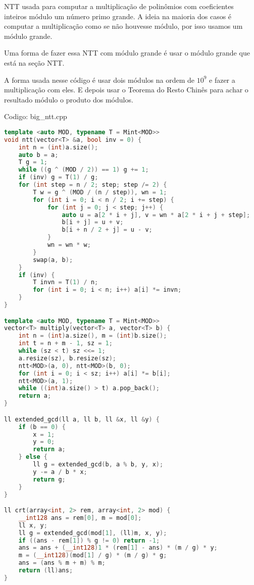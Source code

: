 \documentclass[10pt, a4paper, oneside]{book}
\begin{document}
NTT usada para computar a multiplicação de polinômios com coeficientes inteiros módulo um número primo grande. A ideia na maioria dos casos é computar a multiplicação como se não houvesse módulo, por isso usamos um módulo grande.



Uma forma de fazer essa NTT com módulo grande é usar o módulo grande que está na seção NTT.



A forma usada nesse código é usar dois módulos na ordem de $10^9$ e fazer a multiplicação com eles. E depois usar o Teorema do Resto Chinês para achar o resultado módulo o produto dos módulos.
\hfill

Codigo: big\_ntt.cpp

\begin{lstlisting}[language=C++]
template <auto MOD, typename T = Mint<MOD>>
void ntt(vector<T> &a, bool inv = 0) {
    int n = (int)a.size();
    auto b = a;
    T g = 1;
    while ((g ^ (MOD / 2)) == 1) g += 1;
    if (inv) g = T(1) / g;
    for (int step = n / 2; step; step /= 2) {
        T w = g ^ (MOD / (n / step)), wn = 1;
        for (int i = 0; i < n / 2; i += step) {
            for (int j = 0; j < step; j++) {
                auto u = a[2 * i + j], v = wn * a[2 * i + j + step];
                b[i + j] = u + v;
                b[i + n / 2 + j] = u - v;
            }
            wn = wn * w;
        }
        swap(a, b);
    }
    if (inv) {
        T invn = T(1) / n;
        for (int i = 0; i < n; i++) a[i] *= invn;
    }
}

template <auto MOD, typename T = Mint<MOD>>
vector<T> multiply(vector<T> a, vector<T> b) {
    int n = (int)a.size(), m = (int)b.size();
    int t = n + m - 1, sz = 1;
    while (sz < t) sz <<= 1;
    a.resize(sz), b.resize(sz);
    ntt<MOD>(a, 0), ntt<MOD>(b, 0);
    for (int i = 0; i < sz; i++) a[i] *= b[i];
    ntt<MOD>(a, 1);
    while ((int)a.size() > t) a.pop_back();
    return a;
}

ll extended_gcd(ll a, ll b, ll &x, ll &y) {
    if (b == 0) {
        x = 1;
        y = 0;
        return a;
    } else {
        ll g = extended_gcd(b, a % b, y, x);
        y -= a / b * x;
        return g;
    }
}

ll crt(array<int, 2> rem, array<int, 2> mod) {
    __int128 ans = rem[0], m = mod[0];
    ll x, y;
    ll g = extended_gcd(mod[1], (ll)m, x, y);
    if ((ans - rem[1]) % g != 0) return -1;
    ans = ans + (__int128)1 * (rem[1] - ans) * (m / g) * y;
    m = (__int128)(mod[1] / g) * (m / g) * g;
    ans = (ans % m + m) % m;
    return (ll)ans;
}


\end{lstlisting}
\end{document}
